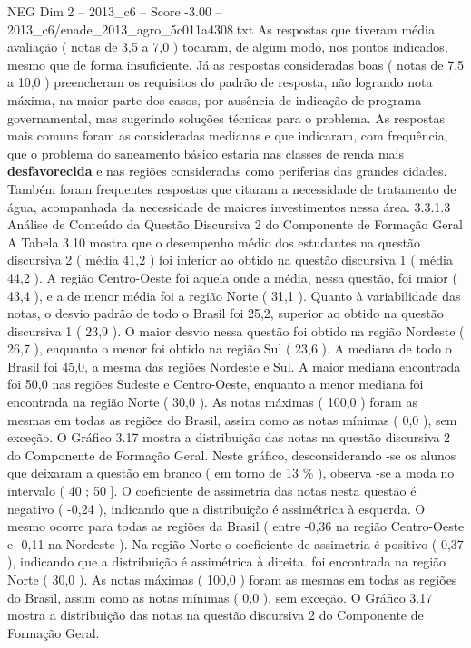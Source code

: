 \begin{textsample}{NEG Dim 2 – 2013\_c6 – Score -3.00 – 2013\_c6/enade\_2013\_agro\_5c011a4308.txt}
As respostas que tiveram média avaliação ( notas de 3,5 a 7,0 ) tocaram, de algum modo, nos pontos indicados, mesmo que de forma insuficiente.
Já as respostas consideradas boas ( notas de 7,5 a 10,0 ) preencheram os requisitos do padrão de resposta, não logrando nota máxima, na maior parte dos casos, por ausência de indicação de programa governamental, mas sugerindo soluções técnicas para o problema.
As respostas mais comuns foram as consideradas medianas e que indicaram, com frequência, que o problema do saneamento básico estaria nas classes de renda mais \textbf{desfavorecida} e nas regiões consideradas como periferias das grandes cidades.
Também foram frequentes respostas que citaram a necessidade de tratamento de água, acompanhada da necessidade de maiores investimentos nessa área. 3.3.1.3 Análise de Conteúdo da Questão Discursiva 2 do Componente de Formação Geral A Tabela 3.10 mostra que o desempenho médio dos estudantes na questão discursiva 2 ( média 41,2 ) foi inferior ao obtido na questão discursiva 1 ( média 44,2 ).
A região Centro-Oeste foi aquela onde a média, nessa questão, foi maior ( 43,4 ), e a de menor média foi a região Norte ( 31,1 ).
Quanto à variabilidade das notas, o desvio padrão de todo o Brasil foi 25,2, superior ao obtido na questão discursiva 1 ( 23,9 ).
O maior desvio nessa questão foi obtido na região Nordeste ( 26,7 ), enquanto o menor foi obtido na região Sul ( 23,6 ).
A mediana de todo o Brasil foi 45,0, a mesma das regiões Nordeste e Sul.
A maior mediana encontrada foi 50,0 nas regiões Sudeste e Centro-Oeste, enquanto a menor mediana foi encontrada na região Norte ( 30,0 ).
As notas máximas ( 100,0 ) foram as mesmas em todas as regiões do Brasil, assim como as notas mínimas ( 0,0 ), sem exceção.
O Gráfico 3.17 mostra a distribuição das notas na questão discursiva 2 do Componente de Formação Geral.
Neste gráfico, desconsiderando -se os alunos que deixaram a questão em branco ( em torno de 13 \% ), observa -se a moda no intervalo ( 40 ; 50 ].
O coeficiente de assimetria das notas nesta questão é negativo ( -0,24 ), indicando que a distribuição é assimétrica à esquerda.
O mesmo ocorre para todas as regiões da Brasil ( entre -0,36 na região Centro-Oeste e -0,11 na Nordeste ).
Na região Norte o coeficiente de assimetria é positivo ( 0,37 ), indicando que a distribuição é assimétrica à direita. foi encontrada na região Norte ( 30,0 ).
As notas máximas ( 100,0 ) foram as mesmas em todas as regiões do Brasil, assim como as notas mínimas ( 0,0 ), sem exceção.
O Gráfico 3.17 mostra a distribuição das notas na questão discursiva 2 do Componente de Formação Geral.

\end{textsample}
